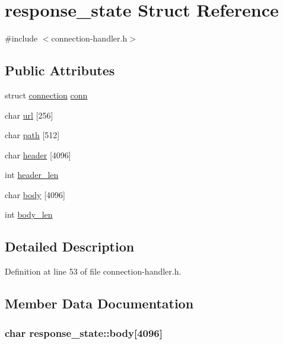\hypertarget{structresponse__state}{\section{response\-\_\-state Struct Reference}
\label{structresponse__state}
}


{\ttfamily \#include $<$connection-\/handler.\-h$>$}

\subsection*{Public Attributes}
\begin{DoxyCompactItemize}
\item 
struct \hyperlink{structconnection}{connection} \hyperlink{structresponse__state_ac1ab399c44d920b03094a1f86b999cf2}{conn}
\item 
char \hyperlink{structresponse__state_a8f1c401abbed7387d7e60181d0cb2791}{url} \mbox{[}256\mbox{]}
\item 
char \hyperlink{structresponse__state_a75a4c831eb68ee7fa4461880cae317fd}{path} \mbox{[}512\mbox{]}
\item 
char \hyperlink{structresponse__state_a113400b7048467806cd387773c08a6ce}{header} \mbox{[}4096\mbox{]}
\item 
int \hyperlink{structresponse__state_aa9c31e39cf92543b35d7dccd0008474a}{header\-\_\-len}
\item 
char \hyperlink{structresponse__state_a6900241c978bbd889c34559bf4027676}{body} \mbox{[}4096\mbox{]}
\item 
int \hyperlink{structresponse__state_afb8bdb798bbdbb28c0fe6a8854ee353c}{body\-\_\-len}
\end{DoxyCompactItemize}


\subsection{Detailed Description}


Definition at line 53 of file connection-\/handler.\-h.



\subsection{Member Data Documentation}
\hypertarget{structresponse__state_a6900241c978bbd889c34559bf4027676}{
\subsubsection[{body}]{\setlength{\rightskip}{0pt plus 5cm}char response\-\_\-state\-::body\mbox{[}4096\mbox{]}}}\label{structresponse__state_a6900241c978bbd889c34559bf4027676}


